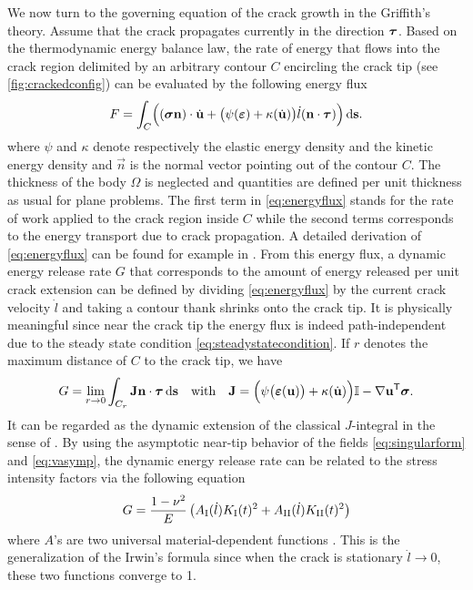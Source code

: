 We now turn to the governing equation of the crack growth in the Griffith's theory. Assume that the crack propagates currently in the direction $\vtau$. Based on the thermodynamic energy balance law, the rate of energy that flows into the crack region delimited by an arbitrary contour $C$ encircling the crack tip (see \cref{fig:crackedconfig}) can be evaluated by the following energy flux
\begin{equation} \label{eq:energyflux}
F=\int_C\Bigl((\sig\vec{n})\cdot\dot{\vec{u}}+\bigl(\psi(\eps)+\kappa(\dot{\vec{u}})\bigr)\dot{l}(\vec{n}\cdot\vtau)\Bigr)\ds.
\end{equation}
where $\psi$ and $\kappa$ denote respectively the elastic energy density and the kinetic energy density and $\vec{n}$ is the normal vector pointing out of the contour $C$. The thickness of the body $\Omega$ is neglected and quantities are defined per unit thickness as usual for plane problems. The first term in \eqref{eq:energyflux} stands for the rate of work applied to the crack region inside $C$ while the second terms corresponds to the energy transport due to crack propagation. A detailed derivation of \eqref{eq:energyflux} can be found for example in \cite{Freund:1972,NakamuraShihFreund:1985}. From this energy flux, a dynamic energy release rate $G$ that corresponds to the amount of energy released per unit crack extension can be defined by dividing \eqref{eq:energyflux} by the current crack velocity $\dot{l}$ and taking a contour thank shrinks onto the crack tip. It is physically meaningful since near the crack tip the energy flux is indeed path-independent due to the steady state condition \eqref{eq:steadystatecondition}. If $r$ denotes the maximum distance of $C$ to the crack tip, we have
\begin{equation} \label{eq:Jdyn}
G=\lim_{r\to 0}\int_{C_r}\vec{J}\vec{n}\cdot\vtau\ds\quad\text{with}\quad\vec{J}=\Bigl(\psi\bigl(\eps(\vec{u})\bigr)+\kappa(\dot{\vec{u}})\Bigr)\mathbb{I}-\nabla\vec{u}^\mT\sig.
\end{equation}
It can be regarded as the dynamic extension of the classical $J$-integral in the sense of \cite{Cherepanov:1967aa,Rice:1968aa}. By using the asymptotic near-tip behavior of the fields \eqref{eq:singularform} and \eqref{eq:vasymp}, the dynamic energy release rate can be related to the stress intensity factors via the following equation
\begin{equation} \label{eq:GasafunctionofK}
G=\frac{1-\nu^2}{E}\left(A_\RN{1}(\dot{l})K_\RN{1}(t)^2+A_\RN{2}(\dot{l})K_\RN{2}(t)^2\right)
\end{equation}
where $A$'s are two universal material-dependent functions \cite[p.~234]{Freund:1990}. This is the generalization of the Irwin's formula \cite{Irwin:1957aa} since when the crack is stationary $\dot{l}\to 0$, these two functions converge to 1.

